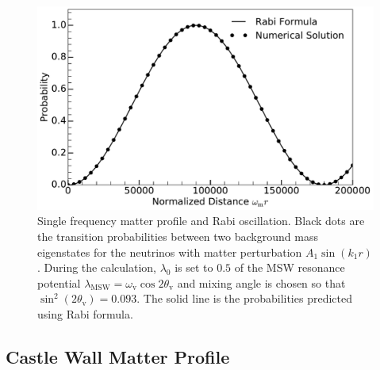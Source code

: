 \documentclass[%
reprint,
 amsmath,amssymb,
 aps,
]{revtex4-1}
\begin{document}
\begin{figure}[!htbp]
                \centering
                \includegraphics[width=\columnwidth]{assets/rabiOscillationsNeutrinoCoincidence-single-frequency}
                \caption{Single frequency matter profile and Rabi oscillation.  Black dots are the transition probabilities between two background mass eigenstates for the neutrinos with matter perturbation $A_1\sin(k_1 r)$. During the calculation, $\lambda_0$ is set to $0.5$ of the MSW resonance potential $\lambda_{\mathrm{MSW}}=\omega_{\mathrm{v}}\cos 2\theta_{\mathrm v}$ and mixing angle is chosen so that $\sin^2(2\theta_{\mathrm v}) = 0.093$. The solid line is the probabilities predicted using Rabi formula.}
                \label{fig-rabiOscillationsNeutrinoCoincidence}
\end{figure}






\subsection{Castle Wall Matter Profile}
\end{document}
